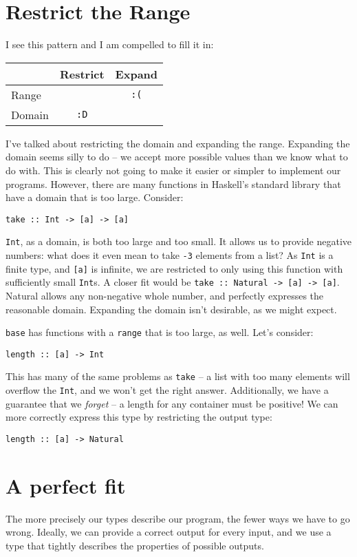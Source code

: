 \section{Restrict the Range}

I see this pattern and I am compelled to fill it in:
\begin{table}[htbp]
\centering
\begin{tabular}{lcc}
 & \textbf{Restrict}  & \textbf{Expand} \\
\hline
Range &  & \texttt{:(} \\
Domain & \texttt{:D} & \\
\end{tabular} 
\end{table}
I've talked about restricting the domain and expanding the range. Expanding the domain seems silly to do -- we accept more possible values than we know what to do with. This is clearly not going to make it easier or simpler to implement our programs. However, there are many functions in Haskell's standard library that have a domain that is too large. Consider:

\begin{verbatim}
take :: Int -> [a] -> [a]
\end{verbatim}
\texttt{Int}, as a domain, is both too large and too small. It allows us to provide negative numbers: what does it even mean to take \texttt{-3} elements from a list? As \texttt{Int} is a finite type, and \texttt{[a]} is infinite, we are restricted to only using this function with sufficiently small \texttt{Int}s. A closer fit would be \texttt{take :: Natural -> [a] -> [a]}. Natural allows any non-negative whole number, and perfectly expresses the reasonable domain. Expanding the domain isn't desirable, as we might expect.

\texttt{base} has functions with a \texttt{range} that is too large, as well. Let's consider:
\begin{verbatim}
length :: [a] -> Int
\end{verbatim}
This has many of the same problems as \texttt{take} -- a list with too many elements will overflow the \texttt{Int}, and we won't get the right answer. Additionally, we have a guarantee that we \textit{forget} -- a length for any container must be positive! We can more correctly express this type by restricting the output type:

\begin{verbatim}
length :: [a] -> Natural
\end{verbatim}

\section{A perfect fit}


The more precisely our types describe our program, the fewer ways we have to go wrong. Ideally, we can provide a correct output for every input, and we use a type that tightly describes the properties of possible outputs.
